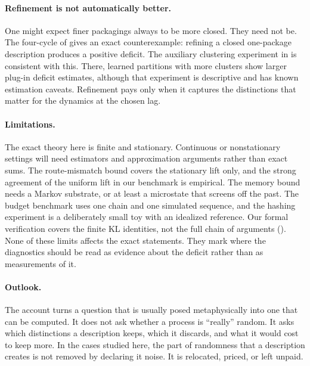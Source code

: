 \paragraph{Refinement is not automatically better.} One might expect finer packagings always to be more closed. They need not be. The four-cycle of  gives an exact counterexample: refining a closed one-package description produces a positive deficit. The auxiliary clustering experiment in  is consistent with this. There, learned partitions with more clusters show larger plug-in deficit estimates, although that experiment is descriptive and has known estimation caveats. Refinement pays only when it captures the distinctions that matter for the dynamics at the chosen lag.

\paragraph{Limitations.} The exact theory here is finite and stationary. Continuous or nonstationary settings will need estimators and approximation arguments rather than exact sums. The route-mismatch bound covers the stationary lift only, and the strong agreement of the uniform lift in our benchmark is empirical. The memory bound needs a Markov substrate, or at least a microstate that screens off the past. The budget benchmark uses one chain and one simulated sequence, and the hashing experiment is a deliberately small toy with an idealized reference. Our formal verification covers the finite KL identities, not the full chain of arguments (). None of these limits affects the exact statements. They mark where the diagnostics should be read as evidence about the deficit rather than as measurements of it.

\paragraph{Outlook.} The account turns a question that is usually posed metaphysically into one that can be computed. It does not ask whether a process is ``really'' random. It asks which distinctions a description keeps, which it discards, and what it would cost to keep more. In the cases studied here, the part of randomness that a description creates is not removed by declaring it noise. It is relocated, priced, or left unpaid.
